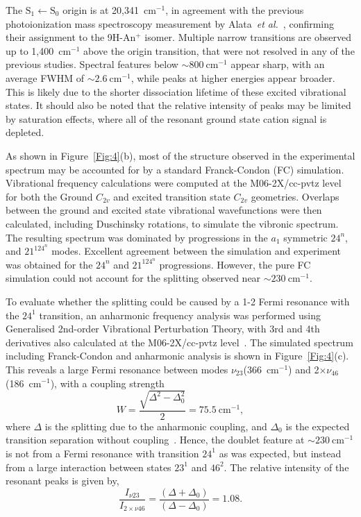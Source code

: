 \documentclass[journal=jpcafh,manuscript=article,layout=onecolumn, 12pt]{achemso}
\begin{document}
The $\text{S}_1\leftarrow \text{S}_0$ origin is at 20,341~cm$^{-1}$, in agreement with the previous photoionization mass spectroscopy measurement by Alata~\emph{et al.}~\cite{ala10}, confirming their assignment to the 9H-An$^+$ isomer. Multiple narrow transitions are observed up to 1,400~cm$^{-1}$ above the origin transition, that were not resolved in any of the previous studies. Spectral features below $\sim800~$cm$^{-1}$ appear sharp, with an average FWHM of $\sim 2.6~$cm$^{-1}$, while peaks at higher energies appear broader. This is likely due to the shorter dissociation lifetime of these excited vibrational states. It should also be noted that the relative intensity of peaks may be limited by saturation effects, where all of the resonant ground state cation signal is depleted.

As shown in Figure~\ref{Fig:4}(b), most of the structure observed in the experimental spectrum may be accounted for by a standard Franck-Condon (FC) simulation. Vibrational frequency calculations were computed at the M06-2X/cc-pvtz level for both the Ground $C_{2v}$ and excited transition state $C_{2v}$ geometries. Overlaps between the ground and excited state vibrational wavefunctions were then calculated, including Duschinsky rotations, to simulate the vibronic spectrum. The resulting spectrum was dominated by progressions in the $a_1$ symmetric $24^n$, and $21^124^n$ modes. Excellent agreement between the simulation and experiment was obtained for the $24^n$ and $21^124^n$ progressions. However, the pure FC simulation could not account for the splitting observed near $\sim230~$cm$^{-1}$. 

To evaluate whether the splitting could be caused by a 1-2 Fermi resonance with the $24^1$ transition, an anharmonic frequency analysis was performed using Generalised 2nd-order Vibrational Perturbation Theory, with 3rd and 4th derivatives also calculated at the M06-2X/cc-pvtz level~\cite{bio12}. The simulated spectrum including Franck-Condon and anharmonic analysis is shown in Figure~\ref{Fig:4}(c). This reveals a large Fermi resonance between modes $\nu_23$(366~cm$^{-1}$) and 2$\times\nu_{46}$(186~cm$^{-1}$), with a coupling strength
\begin{equation}
W = \frac{\sqrt{\Delta^2-\Delta_0^2}}{2} =75.5~\text{cm}^{-1},
\label{eq:1}
\end{equation} 
where $\Delta$ is the splitting due to the anharmonic coupling, and $\Delta_0$ is the expected transition separation without coupling~\cite{bur10}. Hence, the doublet feature at $\sim230~$cm$^{-1}$ is not from a Fermi resonance with transition $24^1$ as was expected, but instead from a large interaction between states $23^1$ and $46^2$. The relative intensity of the resonant peaks is given by,
\begin{equation}
\frac{I_{\nu 23}}{I_{2\times \nu 46}} = \frac{\left(\Delta+\Delta_0\right)}{\left(\Delta-\Delta_0\right)}=1.08.
\label{eq:2}
\end{equation}
\end{document}
